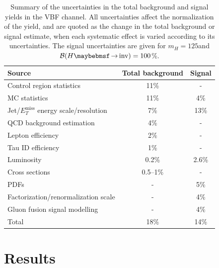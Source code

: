 \begin{table}[!htb]
\centering
\begin{tabular}{|l|c|c|}
\hline
Source                                           & Total background & Signal \\
\hline\hline
Control region statistics                        & 11\%             & -      \\
MC statistics                                    & 11\%             & 4\%    \\
Jet/$E_T^{\text{miss}}$ energy scale/resolution  & 7\%              & 13\%   \\
QCD background estimation                        & 4\%              & -      \\
Lepton efficiency                                & 2\%              & -      \\
Tau ID efficiency                                & 1\%              & -      \\
Luminosity                                       & 0.2\%            & 2.6\%  \\
Cross sections                                   & 0.5--1\%         & -      \\
PDFs                                             & -                & 5\%    \\
Factorization/renormalization scale              & -                & 4\%    \\
Gluon fusion signal modelling                    & -                & 4\%    \\
\hline\hline
Total                                            & 18\%             & 14\%   \\
\hline 
\end{tabular}
\caption{Summary of the uncertainties in the total background and signal yields in the VBF channel. All uncertainties affect the normalization of the yield, and are quoted as the change in the total background or signal estimate, when each systematic effect is varied according to its uncertainties. The signal uncertainties are given for $m_H=125$\GeV and $\BRinv=100$\%. \cite{ARTICLE:CMSVBFHiggsToInvAndZHCombination}}
\label{TABLE:PromptDataAnalysis_SourcesUncertaintySummary}
\end{table}


\section{Results}


